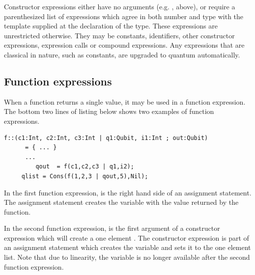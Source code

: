 
Constructor expressions either have no arguments
 (e.g. ,  above), or
require a parenthesized list of expressions which agree in both
number and type with the template supplied at the declaration of the
type. These expressions are unrestricted otherwise. They may be constants,
identifiers, other constructor expressions, expression calls or compound
expressions. Any expressions that are classical in nature, such as constants,
are upgraded to quantum automatically.

\subsection{Function expressions}\label{subsec:expressioncalls}
When a function returns a single value, it may be used in a
function expression. The bottom two lines of listing below shows
two examples of function expressions. 
\begin{lstlisting}[style=linqpl]
      f::(c1:Int, c2:Int, c3:Int | q1:Qubit, i1:Int ; out:Qubit)
      = { ... }
      ...
         qout  = f(c1,c2,c3 | q1,i2);
	 qlist = Cons(f(1,2,3 | qout,5),Nil);
\end{lstlisting}
In the first function expression,  is the right hand side of 
an assignment statement. The assignment statement
 creates the variable 
with the value returned by the function.

In the second function expression,  is the first argument of a 
constructor expression which will create a one element .
The constructor expression is part of an assignment statement which
creates the variable  and sets it to
the one element list. Note that due to linearity, the variable 
 is no longer available after the second function expression.

